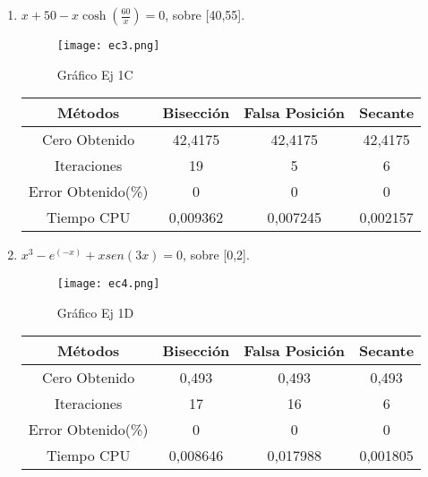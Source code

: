 \documentclass{udpreport}
\begin{document}
\begin{enumerate}
\begin{enumerate}
        
    
    \item \(x + 50 -x\cosh(\frac{60}{x}) = 0 \), sobre [40,55].\\
        \begin{figure}[H]
            \centering
            \texttt{[image: ec3.png]}
            \caption{Gráfico Ej 1C}
        \end{figure}
            \begin{table}[H]
            \centering
           \begin{tabular} { |c|c|c|c|}
                \hline
                Métodos       & Bisección & Falsa Posición & Secante  \\
                \hline
                Cero Obtenido &  42,4175      &    42,4175     &      42,4175   \\
                \hline
                Iteraciones   &    19        &    5     &      6        \\
                \hline
                Error Obtenido(\%) &       0      &       0      &     0         \\
                \hline
                Tiempo CPU &       0,009362     &      0,007245    &     0,002157         \\
                 \hline
                \end{tabular}
            \end{table}
      

    
    \item \(x^3-e^(-x)+xsen(3x) = 0 \), sobre [0,2].\\
        
        \begin{figure}[H]
        \centering
        \texttt{[image: ec4.png]}
        \caption{Gráfico Ej 1D}
        \end{figure}
        \begin{table}[H]
        \centering
           \begin{tabular} { |c|c|c|c|}
                \hline
                Métodos       & Bisección & Falsa Posición & Secante  \\
                \hline
                Cero Obtenido &  0,493      &    0,493     &      0,493   \\
                \hline
                Iteraciones   &   17        &    16     &      6     \\
                \hline
                Error Obtenido(\%) &       0      &       0      &     0         \\
                \hline
                Tiempo CPU &      0,008646     &      0,017988    &     0,001805         \\
                 \hline
                \end{tabular}
            \end{table}
      

\end{enumerate}
\end{enumerate}
\end{document}
